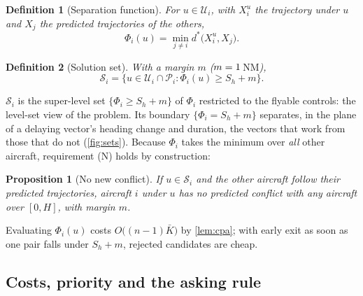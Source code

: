 \documentclass[11pt,a4paper]{article}
\newtheorem{definition}{Definition}
\newtheorem{proposition}{Proposition}
\newcommand{\Sh}{S_h}
\newcommand{\NM}{\ensuremath{\,\mathrm{NM}}}
\begin{document}
\begin{definition}[Separation function]
For $u\in\mathcal U_i$, with $X_i^u$ the trajectory under $u$ and $X_j$ the predicted trajectories of the others,
\begin{equation}
\Phi_i(u) = \min_{j\ne i} d^*\big(X_i^u, X_j\big).
\end{equation}
\end{definition}

\begin{definition}[Solution set]
With a margin $m$ ($m=1$\NM),
\begin{equation}
\mathcal S_i = \{u\in\mathcal U_i\cap\mathcal P_i : \Phi_i(u)\ge \Sh + m\}.
\end{equation}
\end{definition}

$\mathcal S_i$ is the super-level set $\{\Phi_i\ge \Sh+m\}$ of $\Phi_i$ restricted to the flyable controls: the
level-set view of the problem. Its boundary $\{\Phi_i = \Sh+m\}$ separates, in the plane of a delaying vector's
heading change and duration, the vectors that work from those that do not (\cref{fig:sets}). Because $\Phi_i$ takes
the minimum over \emph{all} other aircraft, requirement (N) holds by construction:

\begin{proposition}[No new conflict]
If $u\in\mathcal S_i$ and the other aircraft follow their predicted trajectories, aircraft $i$ under $u$ has no
predicted conflict with any aircraft over $[0,H]$, with margin $m$.
\end{proposition}

Evaluating $\Phi_i(u)$ costs $O\big((n-1)\bar K\big)$ by \cref{lem:cpa}; with early exit as soon as one pair falls
under $\Sh+m$, rejected candidates are cheap.

\subsection{Costs, priority and the asking rule}
\end{document}
